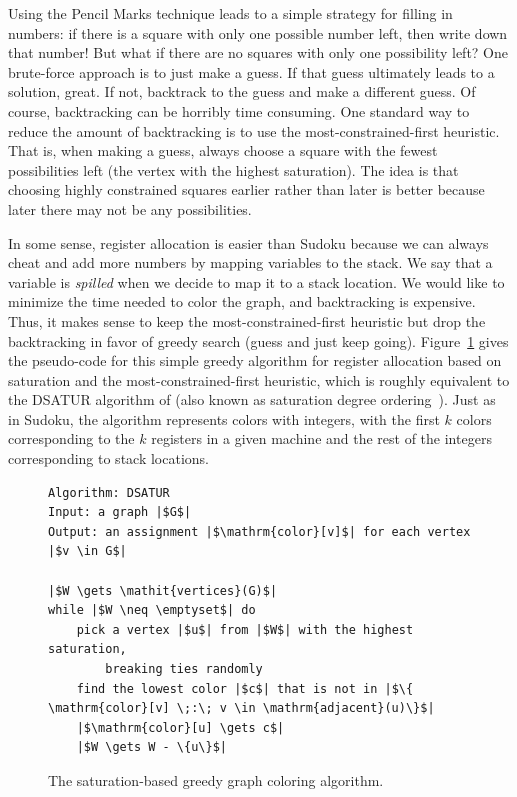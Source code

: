 \documentclass[11pt]{book}
\begin{document}
Using the Pencil Marks technique leads to a simple strategy for
filling in numbers: if there is a square with only one possible number
left, then write down that number! But what if there are no squares
with only one possibility left? One brute-force approach is to just
make a guess. If that guess ultimately leads to a solution, great.  If
not, backtrack to the guess and make a different guess.  Of course,
backtracking can be horribly time consuming. One standard way to
reduce the amount of backtracking is to use the most-constrained-first
heuristic. That is, when making a guess, always choose a square with
the fewest possibilities left (the vertex with the highest saturation).
The idea is that choosing highly constrained squares earlier rather
than later is better because later there may not be any possibilities.

In some sense, register allocation is easier than Sudoku because we
can always cheat and add more numbers by mapping variables to the
stack. We say that a variable is \emph{spilled} when we decide to map
it to a stack location. We would like to minimize the time needed to
color the graph, and backtracking is expensive. Thus, it makes sense
to keep the most-constrained-first heuristic but drop the backtracking
in favor of greedy search (guess and just keep going).
Figure~\ref{fig:satur-algo} gives the pseudo-code for this simple
greedy algorithm for register allocation based on saturation and the
most-constrained-first heuristic, which is roughly equivalent to the
DSATUR algorithm of \cite{Brelaz:1979eu} (also known as saturation
degree ordering~\citep{Gebremedhin:1999fk,Omari:2006uq}).  Just
as in Sudoku, the algorithm represents colors with integers, with the
first $k$ colors corresponding to the $k$ registers in a given machine
and the rest of the integers corresponding to stack locations.

\begin{figure}[btp]
  \centering
\begin{lstlisting}[basicstyle=\rmfamily,deletekeywords={for,from,with,is,not,in,find},morekeywords={while},columns=fullflexible]
Algorithm: DSATUR
Input: a graph |$G$|
Output: an assignment |$\mathrm{color}[v]$| for each vertex |$v \in G$|

|$W \gets \mathit{vertices}(G)$|
while |$W \neq \emptyset$| do
    pick a vertex |$u$| from |$W$| with the highest saturation,
        breaking ties randomly
    find the lowest color |$c$| that is not in |$\{ \mathrm{color}[v] \;:\; v \in \mathrm{adjacent}(u)\}$|
    |$\mathrm{color}[u] \gets c$|
    |$W \gets W - \{u\}$|
\end{lstlisting}
  \caption{The saturation-based greedy graph coloring algorithm.}
  \label{fig:satur-algo}
\end{figure}
\end{document}

